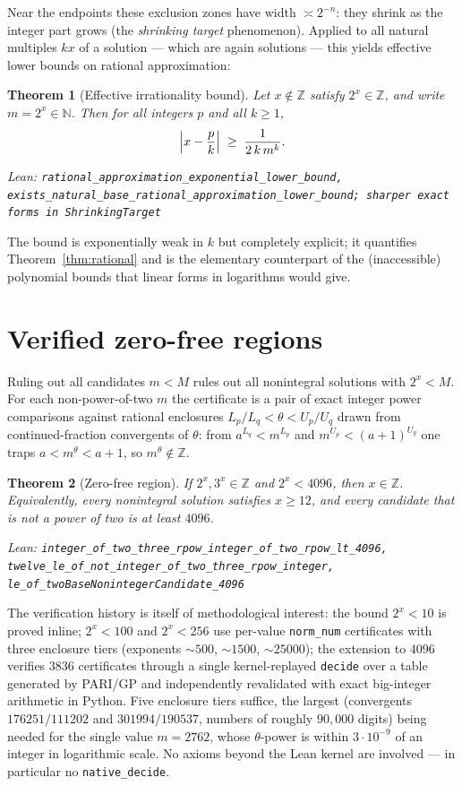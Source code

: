 \documentclass[11pt]{article}
\newtheorem{theorem}{Theorem}[section]
\theoremstyle{definition}
\theoremstyle{remark}
\newcommand{\Z}{\mathbb{Z}}
\newcommand{\N}{\mathbb{N}}
\newcommand{\thetaq}{\theta}
\newcommand{\lean}[1]{\par\smallskip\noindent\begingroup\footnotesize\raggedright\emph{Lean:} \texttt{#1}\par\endgroup}
\newcommand{\leanin}[1]{{\footnotesize\texttt{#1}}}
\begin{document}
Near the endpoints these exclusion zones have width $\asymp 2^{-n}$: they shrink as the
integer part grows (the \emph{shrinking target} phenomenon). Applied to all natural multiples
$kx$ of a solution --- which are again solutions --- this yields effective lower bounds on
rational approximation:

\begin{theorem}[Effective irrationality bound]\label{thm:shrinking}
Let $x\notin\Z$ satisfy $2^x\in\Z$, and write $m=2^x\in\N$. Then for all integers $p$ and all
$k\ge 1$,
\[
\Bigl| x-\frac{p}{k}\Bigr| \;\ge\; \frac{1}{2\,k\,m^{k}}.
\]
\lean{rational\_approximation\_exponential\_lower\_bound,
exists\_natural\_base\_rational\_approximation\_lower\_bound; sharper exact forms in
ShrinkingTarget}
\end{theorem}

The bound is exponentially weak in $k$ but completely explicit; it quantifies
Theorem~\ref{thm:rational} and is the elementary counterpart of the (inaccessible)
polynomial bounds that linear forms in logarithms would give.

\section{Verified zero-free regions}\label{sec:finite}

Ruling out all candidates $m<M$ rules out all nonintegral solutions with $2^x<M$. For each
non-power-of-two $m$ the certificate is a pair of exact integer power comparisons against
rational enclosures $L_p/L_q<\thetaq<U_p/U_q$ drawn from continued-fraction convergents of
$\thetaq$: from $a^{L_q}<m^{L_p}$ and $m^{U_p}<(a+1)^{U_q}$ one traps
$a<m^{\thetaq}<a+1$, so $m^{\thetaq}\notin\Z$.

\begin{theorem}[Zero-free region]\label{thm:finite}
If $2^x,3^x\in\Z$ and $2^x<4096$, then $x\in\Z$. Equivalently, every nonintegral solution
satisfies $x\ge 12$, and every candidate that is not a power of two is at least $4096$.
\lean{integer\_of\_two\_three\_rpow\_integer\_of\_two\_rpow\_lt\_4096,
twelve\_le\_of\_not\_integer\_of\_two\_three\_rpow\_integer,
le\_of\_twoBaseNonintegerCandidate\_4096}
\end{theorem}

The verification history is itself of methodological interest: the bound $2^x<10$ is proved
inline; $2^x<100$ and $2^x<256$ use per-value \leanin{norm\_num} certificates with three
enclosure tiers (exponents ${\sim}500$, ${\sim}1500$, ${\sim}25000$); the extension to
$4096$ verifies $3836$ certificates through a single kernel-replayed \leanin{decide} over a
table generated by PARI/GP and independently revalidated with exact big-integer arithmetic
in Python. Five enclosure tiers suffice, the largest (convergents $176251/111202$ and
$301994/190537$, numbers of roughly $90{,}000$ digits) being needed for the single value
$m=2762$, whose $\thetaq$-power is within $3\cdot 10^{-9}$ of an integer in logarithmic
scale. No axioms beyond the Lean kernel are involved --- in particular no
\leanin{native\_decide}.
\end{document}
